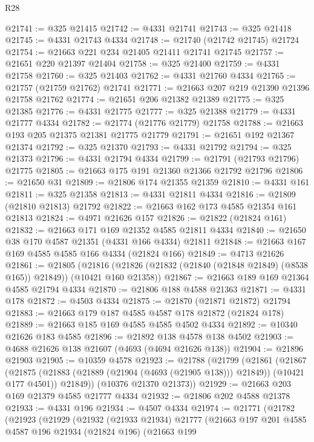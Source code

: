 \begin{lexlean}{R28}
\begin{coremodule}
@21741 := @325 @21415
@21742 := @4331 @21741
@21743 := @325 @21418
@21745 := @4331 @21743 @4334
@21748 := @21740 (@21742 @21745) @21724
@21754 := @21663 @221 @234 @21405 @21411 @21741 @21745
@21757 := @21651 @220 @21397 @21404
@21758 := @325 @21400
@21759 := @4331 @21758
@21760 := @325 @21403
@21762 := @4331 @21760 @4334
@21765 := @21757 (@21759 @21762) @21741
@21771 := @21663 @207 @219 @21390 @21396 @21758 @21762
@21774 := @21651 @206 @21382 @21389
@21775 := @325 @21385
@21776 := @4331 @21775
@21777 := @325 @21388
@21779 := @4331 @21777 @4334
@21782 := @21774 (@21776 @21779) @21758
@21788 := @21663 @193 @205 @21375 @21381 @21775 @21779
@21791 := @21651 @192 @21367 @21374
@21792 := @325 @21370
@21793 := @4331 @21792
@21794 := @325 @21373
@21796 := @4331 @21794 @4334
@21799 := @21791 (@21793 @21796) @21775
@21805 := @21663 @175 @191 @21360 @21366 @21792 @21796
@21806 := @21650 @31
@21809 := @21806 @174 @21355 @21359
@21810 := @4331 @161
@21811 := @325 @21358
@21813 := @4331 @21811 @4334
@21816 := @21809 (@21810 @21813) @21792
@21822 := @21663 @162 @173 @4585 @21354 @161 @21813
@21824 := @4971 @21626 @157
@21826 := @21822 (@21824 @161)
@21832 := @21663 @171 @169 @21352 @4585 @21811 @4334
@21840 := @21650 @38 @170 @4587 @21351 (@4331 @166 @4334) @21811
@21848 := @21663 @167 @169 @4585 @4585 @166 @4334 (@21824 @166)
@21849 := @4713 @21626
@21861 := @21805
    (@21816 (@21826 (@21832 (@21840 (@21848 @21849) (@8538 @165)) @21849)) (@10421 @160 @21358))
@21867 := @21663 @189 @169 @21364 @4585 @21794 @4334
@21870 := @21806 @188 @4588 @21363
@21871 := @4331 @178
@21872 := @4503 @4334
@21875 := @21870 (@21871 @21872) @21794
@21883 := @21663 @179 @187 @4585 @4587 @178 @21872 (@21824 @178)
@21889 := @21663 @185 @169 @4585 @4585 @4502 @4334
@21892 := @10340 @21626 @183 @4585
@21896 := @21892 @138 @4578 @138 @4502
@21903 := @4688 @21626 @138 @21607 (@4693 (@4694 @21626 @138))
@21904 := @21896 @21903
@21905 := @10359 @4578
@21923 := @21788
    (@21799
      (@21861
        (@21867
          (@21875 (@21883 (@21889 (@21904 (@4693 (@21905 @138))) @21849)) (@10421 @177 @4501))
          @21849))
      (@10376 @21370 @21373))
@21929 := @21663 @203 @169 @21379 @4585 @21777 @4334
@21932 := @21806 @202 @4588 @21378
@21933 := @4331 @196
@21934 := @4507 @4334
@21974 := @21771
    (@21782
      (@21923
        (@21929
          (@21932
            (@21933 @21934)
            @21777
            (@21663
              @197
              @201
              @4585
              @4587
              @196
              @21934
              (@21824 @196)
              (@21663
                @199

\end{coremodule}
\end{lexlean}
